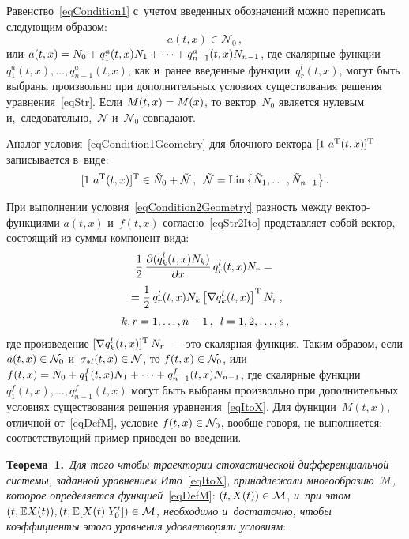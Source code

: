 \begin{multicols}{2}
Равенство~\eqref{eqCondition1} с~учетом введенных обозначений 
можно переписать следующим образом:
\begin{equation}
\label{eqCondition1Geometry}
  a(t,x) \in \mathcal{N}_0\,,
\end{equation}
или $a(t,x) \hm= N_0 \hm+ q_1^a(t,x) N_1 + \cdots + q_{n-1}^a(t,x) N_{n-1}$, где 
скалярные функции $q_1^a(t,x), \ldots, q_{n-1}^a(t,x)$, 
как и~ранее введенные функции~$q_r^l(t,x)$, могут быть выбраны произвольно 
при дополнительных условиях существования решения уравнения~\eqref{eqStr}. 
Если $M(t,x) \hm= M(x)$, то вектор~$N_0$ является нулевым 
и,~следовательно,~$\mathcal{N}$ и~$\mathcal{N}_0$ совпадают.

Аналог условия~\eqref{eqCondition1Geometry} для блочного вектора 
$[ 1 \  a^{{\mathrm{T}}}(t,x) ]^{{\mathrm{T}}}$ записывается в~виде:
$$
  [  1 \  a^{{\mathrm{T}}}(t,x)]^{{\mathrm{T}}} \in \tilde N_0 + \tilde{\mathcal{N}}\,,\enskip
  \tilde{\mathcal{N}} = \mathrm{Lin} \left\{ \tilde{N}_1,\dots,\tilde{N}_{n-1} \right\}.
$$

При выполнении условия~\eqref{eqCondition2Geometry} разность 
между век\-тор-функ\-ци\-ями $a(t,x)$ и~$f(t,x)$ согласно~\eqref{eqStr2Ito} 
представляет собой вектор, состоящий из суммы компонент вида:
\begin{multline*}
  \displaystyle\frac{\displaystyle 1\mathstrut}{\displaystyle 2\mathstrut} \, {\displaystyle\frac{\displaystyle \partial (q_k^l(t,x) N_k)\mathstrut}{\displaystyle \partial x\mathstrut} \, q_r^l(t,x) N_r} = {}\\
  {}=
  \displaystyle\frac{\displaystyle 1\mathstrut}{\displaystyle 2\mathstrut} \, q_r^l(t,x)  N_k  \left[ \nabla q_k^l(t,x) \right]^{{\mathrm{T}}}  N_r\,,
\\
  k,r = 1,\dots,n-1\,, \enskip l = 1,2,\dots,s\,,
\end{multline*}
где произведение $[ \nabla q_k^l(t,x)]^{{\mathrm{T}}} \, N_r$~--- 
это скалярная функция. Таким образом, если $a(t,x) \hm\in \mathcal{N}_0$ 
и~$\sigma_{* l}(t,x) \hm\in \mathcal{N}$, то $f(t,x) \hm\in \mathcal{N}_0$, или 
$f(t,x) \hm= N_0 \hm+ q_1^f(t,x) N_1 + \cdots + q_{n-1}^f(t,x) N_{n-1}$, 
где скалярные функции $q_1^f(t,x), \ldots, q_{n-1}^f(t,x)$ могут 
быть выбраны произвольно при дополнительных условиях существования 
решения уравнения~\eqref{eqItoX}. Для функции~$M(t,x)$, отличной от~\eqref{eqDefM}, 
условие $f(t,x) \hm\in \mathcal{N}_0$, вообще говоря, не выполняется; 
соответствующий пример приведен во введении.

\smallskip

\noindent
\textbf{Теорема~1.}\ 
\textit{Для того чтобы траектории стохастической дифференциальной системы, 
заданной уравнением Ито}~\eqref{eqItoX}, \textit{принадлежали многообразию~$\mathcal{M}$, 
которое определяется функцией}~\eqref{eqDefM}: 
$(t,X(t)) \hm\in \mathcal{M}$, \textit{и~при этом $(t,\mathbb{E} X(t)), 
(t,\mathbb{E}[X(t)|Y_0^t]) \hm\in \mathcal{M}$, необходимо и~достаточно, 
чтобы коэффициенты этого уравнения удовле\-тво\-ря\-ли условиям}:


\end{multicols}
